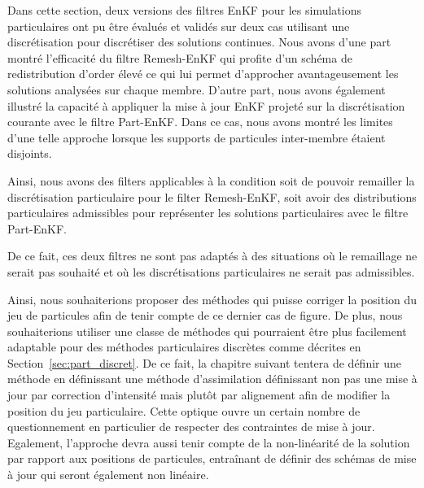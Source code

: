 Dans cette section, deux versions des filtres EnKF pour les simulations particulaires ont pu être évalués et validés sur deux cas utilisant une discrétisation pour discrétiser des solutions continues. Nous avons d'une part montré l'efficacité du filtre Remesh-EnKF qui profite d'un schéma de redistribution d'order élevé ce qui lui permet d'approcher avantageusement les solutions analysées sur chaque membre. D'autre part, nous avons également illustré la capacité à appliquer la mise à jour EnKF projeté sur la discrétisation courante avec le filtre Part-EnKF. Dans ce cas, nous avons montré les limites d'une telle approche lorsque les supports de particules inter-membre étaient disjoints.

Ainsi, nous avons des filters applicables à la condition soit de pouvoir remailler la discrétisation particulaire pour le filter Remesh-EnKF, soit avoir des distributions particulaires admissibles pour représenter les solutions particulaires avec le filtre Part-EnKF.

De ce fait, ces deux filtres ne sont pas adaptés à des situations où le remaillage ne serait pas souhaité et où les discrétisations particulaires ne serait pas admissibles.

Ainsi, nous souhaiterions proposer des méthodes qui puisse corriger la position du jeu de particules afin de tenir compte de ce dernier cas de figure. De plus, nous souhaiterions utiliser une classe de méthodes qui pourraient être plus facilement adaptable pour des méthodes particulaires discrètes comme décrites en Section~\ref{sec:part_discret}.
De ce fait, la chapitre suivant tentera de définir une méthode en définissant une méthode d'assimilation définissant non pas une mise à jour par correction d'intensité mais plutôt par alignement afin de modifier la position du jeu particulaire.
Cette optique ouvre un certain nombre de questionnement en particulier de respecter des contraintes de mise à jour. Egalement, l'approche devra aussi tenir compte de la non-linéarité de la solution par rapport aux positions de particules, entraînant de définir des schémas de mise à jour qui seront également non linéaire.


